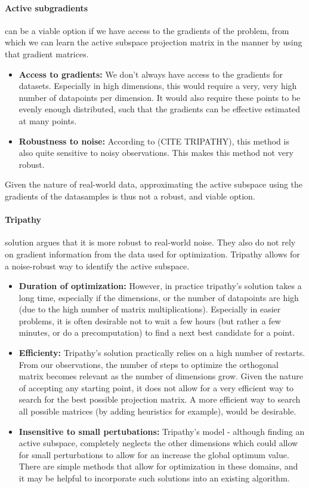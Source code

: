 \paragraph{Active subgradients} can be a viable option if we have access to the gradients of the problem, from which we can learn the active subspace projection matrix in the manner by using that gradient matrices.
\begin{itemize}
\item \textbf{Access to gradients:} We don't always have access to the gradients for datasets. 
Especially in high dimensions, this would require a very, very high number of datapoints per dimension.
It would also require these points to be evenly enough distributed, such that the gradients can be effective estimated at many points. 
\item \textbf{Robustness to noise:} According to (CITE TRIPATHY), this method is also quite sensitive to noisy observations.
This makes this method not very robust.
\end{itemize}

Given the nature of real-world data, approximating the active subspace using the gradients of the datasamples is thus not a robust, and viable option.

\paragraph{Tripathy} solution argues that it is more robust to real-world noise. 
They also do not rely on gradient information from the data used for optimization.
Tripathy allows for a noise-robust way to identify the active subspace.
\begin{itemize}
\item \textbf{Duration of optimization:} However, in practice tripathy's solution takes a long time, especially if the dimensions, or the number of datapoints are high (due to the high number of matrix multiplications). 
Especially in easier problems, it is often desirable not to wait a few hours (but rather a few minutes, or do a precomputation) to find a next best candidate for a point.
\item \textbf{Efficienty:} Tripathy's solution practically relies on a high number of restarts.
From our observations, the number of steps to optimize the orthogonal matrix becomes relevant as the number of dimensions grow.
Given the nature of accepting any starting point, it does not allow for a very efficient way to search for the best possible projection matrix.
A more efficient way to search all possible matrices (by adding heuristics for example), would be desirable.
\item \textbf{Insensitive to small pertubations:} Tripathy's model - although finding an active subspace, completely neglects the other dimensions which could allow for small perturbations to allow for an increase the global optimum value.
There are simple methods that allow for optimization in these domains, and it may be helpful to incorporate such solutions into an existing algorithm.
\end{itemize}

